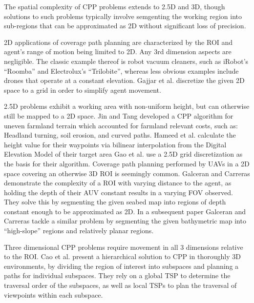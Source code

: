 The spatial complexity of CPP problems extends to 2.5D and 3D, though solutions to such problems typically involve semgenting the working region into sub-regions that can be approximated as 2D without significant loss of precision.

2D applications of coverage path planning are characterized by the ROI and agent's range of motion being limited to 2D.
Any 3rd dimension aspects are negligible.
The classic example thereof is robot vacuum cleaners, such as iRobot's ``Roomba'' and Electrolux's ``Trilobite''\cite{CCPP_cleaning_robots}, whereas less obvious examples include drones that operate at a constant elevation\cite{CPP_2D_convex_regions_uav}.
Gajjar et al. discretize the given 2D space to a grid in order to simplify agent movement\cite{CCPP_known_2D_env}.

2.5D problems exhibit a working area with non-uniform height, but can otherwise still be mapped to a 2D space.
Jin and Tang developed a CPP algorithm for uneven farmland terrain which accounted for farmland relevant costs, such as: Headland turning, soil erosion, and curved paths\cite{CPP_farming_terrain}.
Hameed et al. calculate the height value for their waypoints via bilinear interpolation from the Digital Elevation Model of their target area\cite{CPP_2.5D_agriculture}
Gao et al. use a 2.5D grid discretization as the basis for their algorithm\cite{CPP_2.5D_grid_map}.
Coverage path planning performed by UAVs in a 2D space covering an otherwise 3D ROI is seemingly common\cite{CPP_2.5D_SAA_grid_based_UAV_3D_recons, CPP_2.5D_UAV_3D_terrain_recons, CPP_multi_UAV, CPP_2D_convex_regions_uav}.
Galceran and Carreras demonstrate the complexity of a ROI with varying distance to the agent\cite{CPP_2.5D_seabed_2012}, as holding the depth of their AUV constant results in a varying FOV observed.
They solve this by segmenting the given seabed map into regions of depth constant enough to be approximated as 2D.
In a subsequent paper Galceran and Carreras tackle a similar problem by segmenting the given bathymetric map into ``high-slope'' regions and relatively planar regions\cite{CPP_2.5D_seabed_2013}.

Three dimensional CPP problems require movement in all 3 dimensions relative to the ROI\cite{CPP_survey_for_robotics}.
Cao et al. present a hierarchical solution to CPP in thoroughly 3D environments, by dividing the region of interest into subspaces and planning a paths for individual subspaces\cite{HiCPP_cplx_3D_env}.
They rely on a global TSP to determine the traversal order of the subspaces, as well as local TSPs to plan the traversal of viewpoints within each subspace.

